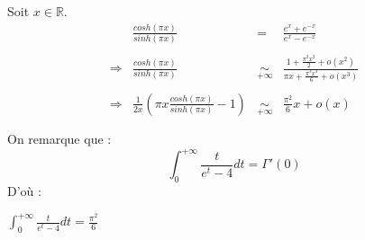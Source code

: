 Soit $x\in \mathbb{R}$.\\
\[
  \begin{array}{rrcl}
                & \frac{cosh(\pi x)}{sinh(\pi x)}                                   & =                        & \frac{e^x + e^{-x}}{e^x-e^{-x}}                                             \\\\
    \Rightarrow & \frac{cosh(\pi x)}{sinh(\pi x)}                                   & \underset{+\infty}{\sim} & \frac{1 + \frac{\pi^2x^2}{2} + o(x^2)}{\pi x + \frac{\pi^3x^3}{6} + o(x^3)} \\\\
    \Rightarrow & \frac{1}{2x}\left(\pi x\frac{cosh(\pi x)}{sinh(\pi x)} - 1\right) & \underset{+\infty}{\sim} & \frac{\pi^2}{6}x + o(x)  \\\\
  \end{array}
\]
On remarque que :
\[
  \int_{0}^{+\infty}{\frac{t}{e^t-4}dt} = \Gamma'(0)
\]
D'où :
\begin{result}
  $\int_{0}^{+\infty}{\frac{t}{e^t-4}dt} = \frac{\pi^2}{6}$
\end{result}
